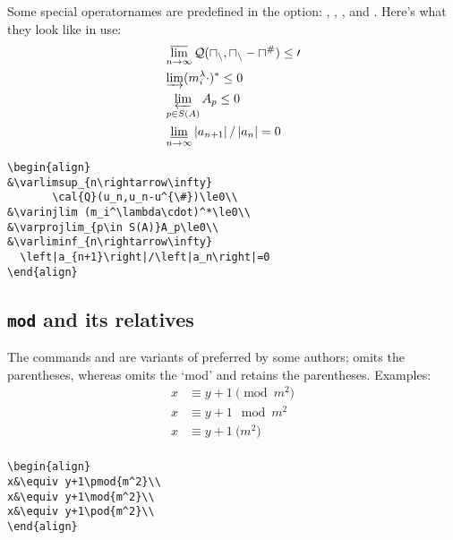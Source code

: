 Some special operatornames are predefined in the
 option:
, , ,
and .
Here's what they look like in use:
\begin{align}
&\varlimsup_{n\rightarrow\infty}
       \cal{Q}(u_n,u_n-u^{\#})\le0\\
&\varinjlim (m_i^\lambda\cdot)^*\le0\\
&\varprojlim_{p\in S(A)}A_p\le0\\
&\varliminf_{n\rightarrow\infty}
  \left|a_{n+1}\right|/\left|a_n\right|=0
\end{align}
\begin{verbatim}
\begin{align}
&\varlimsup_{n\rightarrow\infty}
       \cal{Q}(u_n,u_n-u^{\#})\le0\\
&\varinjlim (m_i^\lambda\cdot)^*\le0\\
&\varprojlim_{p\in S(A)}A_p\le0\\
&\varliminf_{n\rightarrow\infty}
  \left|a_{n+1}\right|/\left|a_n\right|=0
\end{align}
\end{verbatim}

\subsection{{\tt\bslash mod} and its relatives} 
The commands  and  are variants of
 preferred by some authors;  omits the parentheses,
whereas  omits the `mod' and retains the parentheses.
Examples:
\begin{align}
x&\equiv y+1\pmod{m^2}\\
x&\equiv y+1\mod{m^2}\\
x&\equiv y+1\pod{m^2}\\
\end{align}
\begin{verbatim}
\begin{align}
x&\equiv y+1\pmod{m^2}\\
x&\equiv y+1\mod{m^2}\\
x&\equiv y+1\pod{m^2}\\
\end{align}
\end{verbatim}

